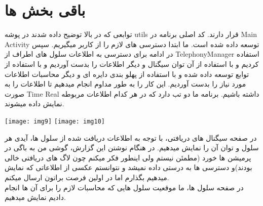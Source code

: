 \documentclass[]{report}
\begin{document}
\section{باقی بخش ها}
توابعی که در بالا توضیح داده شدند در پوشه utils قرار دارند.
کد اصلی برنامه در Main Activity توسعه داده شده است.
ما ابتدا دسترسی های لازم را از کاربر میگیریم.
سپس در ادامه برای دسترسی به اطلاعات سلول های اطراف از TelephonyManager استفاده کردیم و با استفاده از آن توان سیگنال و دیگر اطلاعات را بدست آوردیم و با استفاده از توابع توسعه داده شده و با استفاده از پهلو بندی دایره ای و دیگر محاسبات اطلاعات مورد نیاز را بدست آوردیم. این کار را به طور مداوم انجام میدهیم تا اطلاعات را به صورت Time Real داشته باشیم.
برنامه ما دو تب دارد که در هر کدام اطلاعات مربوطه نمایش داده میشوند.
\begin{center}
	\texttt{[image: img9]}
	\texttt{[image: img10]}
	
	\end{center}
	در صفحه سیگنال های دریافتی، با توجه به اطلاعات دریافت شده از سلول ها، آیدی هر سلول و توان آن را نمایش میدهیم.
	در هنگام نوشتن این گزارش، گوشی من به باگی در پرمیشن ها خورد (مطمئن نیستم ولی اینطور فکر میکنم چون لاگ های دریافتی خالی بودند)و دسترسی ها به درستی داده نمیشد و نتوانستم عکسی از اطلاعاتی که نمایش میدهیم بگذارم اما در اولین فرصت براتون ارسال میکنم.\\
	در صفحه سلول ها، ما موقعیت سلول هایی که محاسبات  لازم را برای آن ها انجام دادیم نمایش میدهیم.
	
\end{document}
